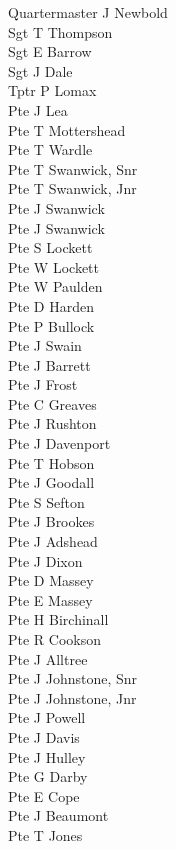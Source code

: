 \begin{multicols}{2}
  \noindent
  Quartermaster J Newbold \\
  Sgt T Thompson \\
  Sgt E Barrow \\
  Sgt J Dale \\
  Tptr P Lomax \\
  Pte J Lea \\
  Pte T Mottershead \\
  Pte T Wardle \\
  Pte T Swanwick, Snr \\
  Pte T Swanwick, Jnr \\
  Pte J Swanwick \\
  Pte J Swanwick \\
  Pte S Lockett \\
  Pte W Lockett \\
  Pte W Paulden \\
  Pte D Harden \\
  Pte P Bullock \\
  Pte J Swain \\
  Pte J Barrett \\
  Pte J Frost \\
  Pte C Greaves \\
  Pte J Rushton \\
  Pte J Davenport \\
  Pte T Hobson \\
  Pte J Goodall \\
  Pte S Sefton \\
  Pte J Brookes \\
  Pte J Adshead \\
  Pte J Dixon \\
  Pte D Massey \\
  Pte E Massey \\
  Pte H Birchinall \\
  Pte R Cookson \\
  Pte J Alltree \\
  Pte J Johnstone, Snr \\
  Pte J Johnstone, Jnr \\
  Pte J Powell \\
  Pte J Davis \\
  Pte J Hulley \\
  Pte G Darby \\
  Pte E Cope \\
  Pte J Beaumont \\
  Pte T Jones \\

\end{multicols}
